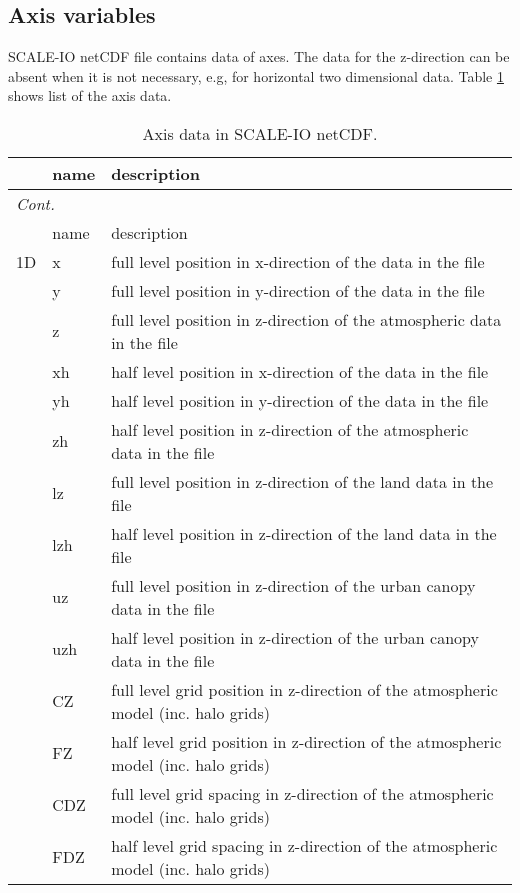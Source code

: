 \subsection{Axis variables}
SCALE-IO netCDF file contains data of axes.
The data for the z-direction can be absent when it is not necessary, e.g, for horizontal two dimensional data.
Table \ref{table:netcdf_axes} shows list of the axis data.
\begin{longtable}{|l|ll|}
  \caption{Axis data in SCALE-IO netCDF.}
  \label{table:netcdf_axes} \\ \hline
  & name & description \\ \hline \hline
  \endfirsthead
  \multicolumn{3}{l}{\small\it Cont.} \\ \hline
  & name & description \\ \hline \hline
  \endhead
  \hline
  \endfoot
    1D
    & x & full level position in x-direction of the data in the file \\
    & y & full level position in y-direction of the data in the file \\
    & z & full level position in z-direction of the atmospheric data in the file \\
    & xh & half level position in x-direction of the data in the file \\
    & yh & half level position in y-direction of the data in the file \\
    & zh & half level position in z-direction of the atmospheric data in the file \\
    & lz & full level position in z-direction of the land data in the file \\
    & lzh & half level position in z-direction of the land data in the file \\
    & uz & full level position in z-direction of the urban canopy data in the file \\
    & uzh & half level position in z-direction of the urban canopy data in the file \\
    & CZ & full level grid position in z-direction of the atmospheric model (inc. halo grids) \\
    & FZ & half level grid position in z-direction of the atmospheric model (inc. halo grids) \\
    & CDZ & full level grid spacing in z-direction of the atmospheric model (inc. halo grids) \\
    & FDZ & half level grid spacing in z-direction of the atmospheric model (inc. halo grids) \\

\end{longtable}
